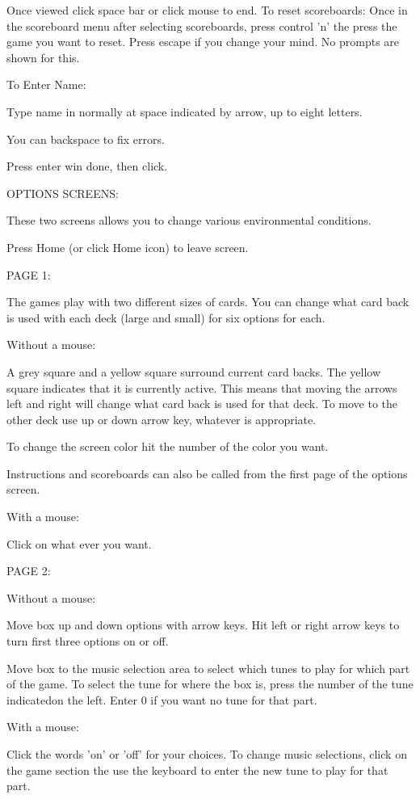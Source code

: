 Once viewed click space bar or click mouse to end.
To reset scoreboards:
     Once in the scoreboard menu after selecting scoreboards, press  
     control 'n' the press the game you want to reset.  Press escape 
     if you change your mind. No prompts are shown for this.

To Enter Name:

Type name in normally at space indicated by arrow, up to eight
letters.

You can backspace to fix errors.

Press enter win done, then click.


OPTIONS SCREENS:

These two screens allows you to change various environmental
conditions.

Press Home (or click Home icon) to leave screen.

PAGE 1:

The games play with two different sizes of cards. You can change what
card back is used with each deck (large and small) for six options
for each.

Without a mouse:

A grey square and a yellow square surround current card backs.  The
yellow square indicates that it is currently active.  This means that
moving the arrows left and right will change what card back is used
for that deck.  To move to the other deck use up or down arrow key,
whatever is appropriate.

To change the screen color hit the number of the color you want.

Instructions and scoreboards can also be called from the first page
of the options screen.

With a mouse:

Click on what ever you want.

PAGE 2:

Without a mouse:

Move box up and down options with arrow keys. Hit left or right arrow
keys to turn first three options on or off.

Move box to the music selection area to select which tunes to play
for which part of the game.  To select the tune for where the box is,
press the number of the tune indicatedon the left.  Enter 0 if you
want no tune for that part.

With a mouse:

Click the words 'on' or 'off' for your choices. To change music
selections, click on the game section the use the keyboard to enter
the new tune to play for that part.

